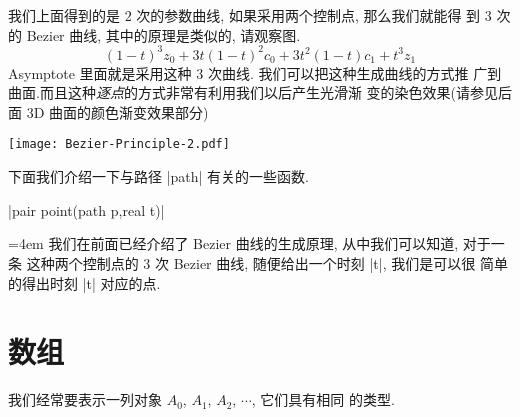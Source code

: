 \documentclass{ctexbook}
\newenvironment{funclist}{\trivlist
  \parindent=0pt
\item[]
  \def\item{\medskip\par\leftskip=0pt}
  \def\go{\par\leftskip=4em}}
{\endtrivlist}
\begin{document}
我们上面得到的是 $2$ 次的参数曲线, 如果采用两个控制点, 那么我们就能得
到 $3$ 次的 Bezier 曲线, 其中的原理是类似的,  请观察图.
\begin{displaymath}
  (1-t)^{3}z_{0}+3t(1-t)^{2}c_{0}+3t^{2}(1-t)c_{1}+t^{3}z_{1}
\end{displaymath}
Asymptote 里面就是采用这种 $3$ 次曲线. 我们可以把这种生成曲线的方式推
广到曲面.而且这种\emph{逐点}的方式非常有利用我们以后产生光滑渐
变的染色效果(请参见后面 3D 曲面的颜色渐变效果部分)

\begin{center}\texttt{[image: Bezier-Principle-2.pdf]}\end{center}%


下面我们介绍一下与路径 |path| 有关的一些函数.

\begin{funclist} |pair point(path p,real t)| \go
我们在前面已经介绍了 Bezier 曲线的生成原理, 从中我们可以知道, 对于一条
这种两个控制点的 3 次 Bezier 曲线, 随便给出一个时刻 |t|, 我们是可以很
简单的得出时刻 |t| 对应的点.
\end{funclist}

\section{数组}
我们经常要表示一列对象 $A_{0}$, $A_{1}$, $A_{2}$, $\cdots$, 它们具有相同
的类型.
\end{document}
